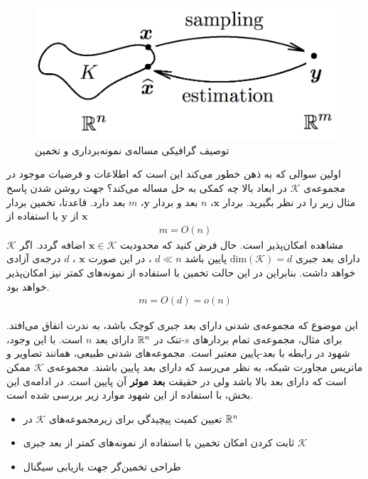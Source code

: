 \begin{figure}
\centering
\includegraphics[scale=0.25]{Images/ch2/fig4.png}
\caption{توصیف گرافیکی مساله‌ی نمونه‌برداری و تخمین \cite{Plan2016}}
\label{fig4}
\end{figure}

اولین سوالی که به ذهن خطور می‌کند این است که اطلاعات و فرضیات موجود در مجموعه‌ی
$\mathcal{K}$
در ابعاد بالا چه کمکی به حل مساله می‌کند؟ جهت روشن شدن پاسخ مثال زیر را در نظر بگیرید. بردار 
$\bm{x}$،
$n$
بعد و بردار 
$\bm{y}$،
$m$
بعد دارد. قاعدتا، تخمین بردار 
$\bm{x}$
از
$\bm{y}$
با استفاده از 
\begin{align*}
m = O\left( n \right)
\end{align*}
مشاهده امکان‌پذیر است. حال فرض کنید که محدودیت 
$\bm{x} \in \mathcal{K}$
اضافه گردد. اگر 
$\mathcal{K}$
دارای بعد جبری
$\text{dim}(\mathcal{K})=d$
پایین باشد
$d \ll n$
، در این صورت 
$\bm{x}$
،
$d$
درجه‌ی آزادی خواهد داشت. بنابراین در این حالت تخمین با استفاده از نمونه‌های کمتر نیز امکان‌پذیر خواهد بود.
\begin{align*}
m = O\left( d \right)=o\left( n \right)
\end{align*}

این موضوع که مجموعه‌ی شدنی دارای بعد جبری کوچک باشد، به ندرت اتفاق می‌افتد. برای مثال، مجموعه‌ی تمام بردار‌های 
$s$-تنک
در 
$\mathbb{R}^{n}$
دارای بعد 
$n$
است. با این وجود، شهود در رابطه با بعد-پایین معتبر است. مجموعه‌های شدنی طبیعی، همانند تصاویر و ماتریس مجاورت شبکه، به نظر می‌رسد که دارای بعد پایین باشند. مجموعه‌ی
$\mathcal{K}$
ممکن است که دارای بعد بالا باشد ولی در حقیقت 
\textbf{بعد موثر}
آن پایین است. در ادامه‌ی این بخش،‌ با استفاده از این شهود موارد زیر بررسی شده است.
\begin{itemize}
\item{
تعیین کمیت پیچیدگی برای زیرمجموعه‌های 
$\mathcal{K}$
در 
$\mathbb{R}^{n}$
}
\item{
ثابت کردن امکان تخمین با استفاده از نمونه‌های کمتر از بعد جبری 
$\mathcal{K}$
}
\item{
طراحی تخمین‌گر جهت بازیابی سیگنال
}
\end{itemize}

